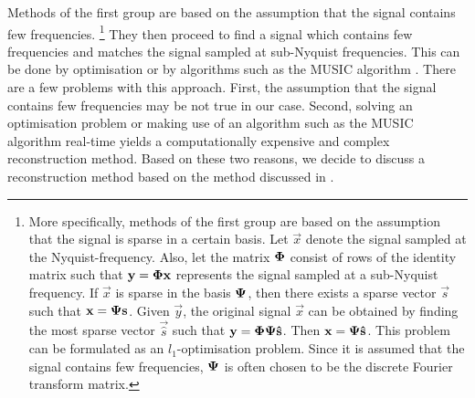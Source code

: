 \documentclass[a4paper, openany, oneside]{memoir}
\begin{document}
Methods of the first group are based on the assumption that the signal contains few frequencies.%
\footnote{More specifically, methods of the first group are based on the assumption that the signal is sparse in a certain basis. Let $\vec{x}$ denote the signal sampled at the Nyquist-frequency. Also, let the matrix $\boldsymbol{\mathbf{\Phi}}$ consist of rows of the identity matrix such that $\boldsymbol{\mathbf{y}}=\boldsymbol{\mathbf{\Phi}}\boldsymbol{\mathbf{x}}$ represents the signal sampled at a sub-Nyquist frequency. If $\vec{x}$ is sparse in the basis $\boldsymbol{\mathbf{\Psi}}$, then there exists a sparse vector $\vec{s}$ such that $\boldsymbol{\mathbf{x}}=\boldsymbol{\mathbf{\Psi}}\boldsymbol{\mathbf{s}}$. Given $\vec{y}$, the original signal $\vec{x}$ can be obtained by finding the most sparse vector $\vec{\hat{s}}$ such that $\boldsymbol{\mathbf{y}}=\boldsymbol{\mathbf{\Phi}}\boldsymbol{\mathbf{\Psi}}\boldsymbol{\mathbf{\hat{s}}}$. Then $\boldsymbol{\mathbf{x}} = \boldsymbol{\mathbf{\Psi}}\boldsymbol{\mathbf{\hat{s}}}$. This problem can be formulated as an $l_1$-optimisation problem. Since it is assumed that the signal contains few frequencies, $\boldsymbol{\mathbf{\Psi}}$ is often chosen to be the discrete Fourier transform matrix.}
They then proceed to find a signal which contains few frequencies and matches the signal sampled at sub-Nyquist frequencies. This can be done by optimisation or by algorithms such as the MUSIC algorithm \cite{pal2011coprime}. There are a few problems with this approach. First, the assumption that the signal contains few frequencies may be not true in our case. Second, solving an optimisation problem or making use of an algorithm such as the MUSIC algorithm real-time yields a computationally expensive and complex reconstruction method. Based on these two reasons, we decide to discuss a reconstruction method based on the method discussed in \cite{ariananda2012compressive}.
\end{document}
